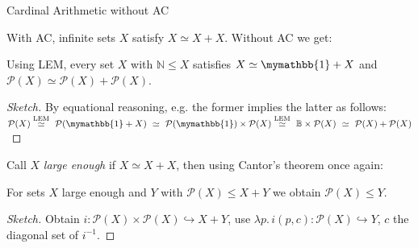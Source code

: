 \documentclass[xcolor=dvipsnames,compress,aspectratio=169,handout]{beamer}
\newcommand{\MBB}[1]{\ensuremath{\mathbb{#1}}\xspace}  %
\newcommand{\MCL}[1]{\ensuremath{\mathcal{#1}}\xspace} %
\newcommand{\Nat}{\MBB{N}}   %
\newcommand{\Bool}{\MBB{B}}  %
\newcommand{\Unit}{\mymathbb{1}}  %
\newcommand{\Pow}{\MCL P}
\begin{document}
\begin{frame}{Cardinal Arithmetic without AC}

With AC, infinite sets $X$ satisfy $X\simeq X+X$.
\pause
Without AC we get:

\begin{lemma}
	Using LEM, every set $X$ with $\Nat\le X$ satisfies $X\simeq\Unit+X$ and $\Pow(X)\simeq\Pow(X)+\Pow(X)$.
\end{lemma}
\vspace{-0.1cm}
\pause
\begin{proof}[Sketch]
	By equational reasoning, e.g. the former implies the latter as follows:
	$\Pow(X)\overset{\textnormal{LEM}}\simeq~\Pow(\Unit+X)~\simeq~\Pow(\Unit)\times \Pow (X)\overset{\textnormal{LEM}}\simeq~\Bool\times \Pow(X)~\simeq~ \Pow(X)+\Pow(X)$
\end{proof}

\pause
\vspace{0.3cm}
Call $X$ \emph{large enough} if $X\simeq X+X$, then using Cantor's theorem once again:
\begin{lemma}
	For sets $X$ large enough and $Y$ with $\Pow (X)\le X+Y$ we obtain $\Pow (X)\le Y$.
\end{lemma}
\pause
\vspace{-0.1cm}
\begin{proof}[Sketch]
	Obtain $i:\Pow (X)\times\Pow (X)\hookrightarrow X+Y$, use $\lambda p.\, i(p,c):\Pow (X)\hookrightarrow Y$, $c$ the diagonal set of $i^{-1}$.
\end{proof}

\end{frame}
\end{document}
